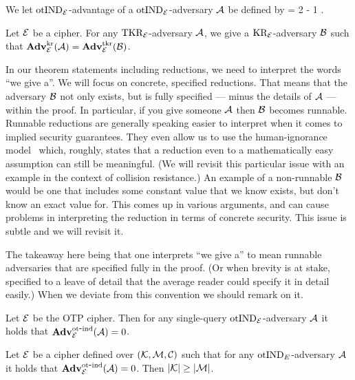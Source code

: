 We let $\textnormal{otIND}_{\cal E}$-advantage of a $\textnormal{otIND}_{\cal E}$-adversary ${\mathcal A}$ be defined by 
\bnm
  \AdvOTIND{\cipher}{\advA} = 2\cdotsm\Prob{\OTIND^\advA_\cipherE \Rightarrow\true} - 1  \;.
\enm

\bigskip
\bigskip




\begin{theorem}
Let ${\cal E}$ be a cipher. For any $\textnormal{TKR}_{\cal E}$-adversary ${\mathcal A}$, we give a
$\textnormal{KR}_{\cal E}$-adversary ${\mathcal B}$ such that 
  $\mathbf{Adv}^{\mathrm{kr}}_{{\cal E}}({\mathcal A}) = \mathbf{Adv}^{\mathrm{tkr}}_{{\cal E}}({\mathcal B})$.
\end{theorem}

In our theorem statements including reductions,  we need to interpret the words
``we give a''. We will focus on concrete, specified reductions. That means that
the adversary ${\mathcal B}$ not only exists, but is fully specified  --- minus the
details of ${\mathcal A}$ ---  within the proof.  In particular, if you give someone
${\mathcal A}$ then ${\mathcal B}$ becomes runnable.  Runnable reductions are generally
speaking easier to interpret when it comes to implied security guarantees. They
even allow us to use the human-ignorance model~\cite{rogaway2006formalizing}
which, roughly, states that a reduction even to a mathematically easy assumption
can still be meaningful. (We will revisit this particular issue with an example
in the context of collision resistance.)
An example of a non-runnable ${\mathcal B}$ would be one that includes some constant
value that we know exists, but don't know an exact value for. This comes up in
various arguments, and can cause problems in interpreting the reduction in terms
of concrete security.  This issue is subtle and we will revisit it.

The takeaway here being that one interprets ``we give a'' to mean runnable
adversaries that are specified fully in the proof. (Or when brevity is at stake,
specified to a leave of detail that the average reader could specify it in
detail easily.)  When we deviate from this convention we should remark on it.




\begin{theorem}
Let ${\cal E}$ be the OTP cipher. Then for any single-query
$\textnormal{otIND}_{\cal E}$-adversary ${\mathcal A}$ it holds that $\mathbf{Adv}^{\mathrm{ot\mbox{-} ind}}_{{\cal E}}({\mathcal A}) = 0$. \end{theorem}


\begin{theorem}
Let ${\cal E}$ be a cipher defined 
over $({\cal K},{\cal M},{\cal C})$ such that for any $\textnormal{otIND}_E$-adversary 
${\mathcal A}$ it holds that $\mathbf{Adv}^{\mathrm{ot\mbox{-} ind}}_{{\cal E}}({\mathcal A}) = 0$. Then $|{\cal K}| \ge
|{\cal M}|$. 
\end{theorem}


